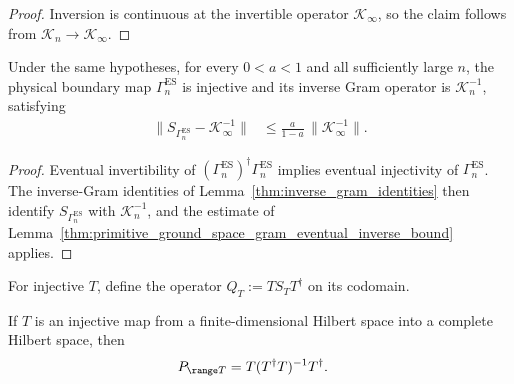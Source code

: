 \begin{proof}
    \leanok
    Inversion is continuous at the invertible operator
    $\mathcal K_\infty$, so the claim follows from
    $\mathcal K_n\to\mathcal K_\infty$.
\end{proof}

\begin{lemma}
    \label{thm:primitive_ground_space_map_eventual_inverse_gram_bound}
    \leanok
    Under the same hypotheses, for every $0<a<1$ and all sufficiently large
    $n$, the physical boundary map $\Gamma_n^{\mathrm{ES}}$ is injective and
    its inverse Gram operator is $\mathcal K_n^{-1}$, satisfying
    \begin{align}
        \bigl\lVert S_{\Gamma_n^{\mathrm{ES}}}
        -\mathcal K_\infty^{-1}\bigr\rVert
         & \leq
        \frac{a}{1-a}\,\bigl\lVert\mathcal K_\infty^{-1}\bigr\rVert.
    \end{align}
\end{lemma}

\begin{proof}
    \leanok
    Eventual invertibility of
    $(\Gamma_n^{\mathrm{ES}})^\dagger\Gamma_n^{\mathrm{ES}}$ implies eventual
    injectivity of $\Gamma_n^{\mathrm{ES}}$.  The inverse-Gram identities of
    Lemma~\ref{thm:inverse_gram_identities} then identify
    $S_{\Gamma_n^{\mathrm{ES}}}$ with $\mathcal K_n^{-1}$, and the estimate of
    Lemma~\ref{thm:primitive_ground_space_gram_eventual_inverse_bound} applies.
\end{proof}

\begin{definition}
    \label{def:injective_range_projector}
    \leanok
    For injective $T$, define the operator $Q_T:=T S_T T^\dagger$ on its
    codomain.
\end{definition}

\begin{lemma}
    \label{thm:injective_range_projector_inverse_gram}
    \leanok
    If $T$ is an injective map from a finite-dimensional Hilbert space into a
    complete Hilbert space, then
    \begin{align}
        P_{\range T} & =T(T^\dagger T)^{-1}T^\dagger.
    \end{align}
\end{lemma}

